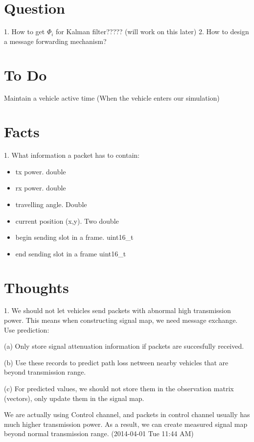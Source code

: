 \documentclass[10pt]{article}
\begin{document}
\section{Question}
1. How to get $\Phi_i$ for Kalman filter????? (will work on this later)
2. How to design a message forwarding mechanism?

\section{To Do}
Maintain a vehicle active time (When the vehicle enters our simulation)


\section {Facts}
1. What information a packet has to contain:
\begin{itemize}
  \item tx power. double
  \item rx power. double
  \item travelling angle. Double
  \item current position (x,y). Two double
  \item begin sending slot in a frame. uint16\_t
  \item end sending slot in a frame  uint16\_t
\end{itemize}

\section {Thoughts}
1. We should not let vehicles send packets with abnormal high transmission power. This means when constructing signal map, we need message exchange.  Use prediction:

(a) Only store signal attenuation information if packets are succesfully received. 

(b) Use these records to predict path loss netween nearby vehicles that are beyond transmission range.

(c) For predicted values, we should not store them in the observation matrix (vectors), only update them in the signal map.

We are actually using Control channel, and packets in control channel usually has much higher transmission power. As a result, we can create measured signal map beyond normal transmission range. (2014-04-01 Tue 11:44 AM)
\end{document}
